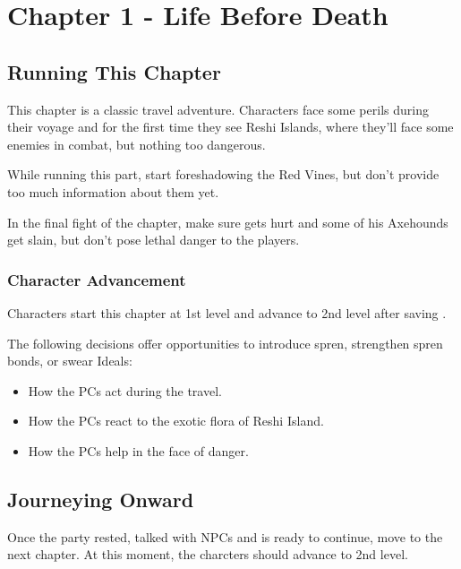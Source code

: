 \chapter{Chapter 1 - Life Before Death}
\label{chap:chapter1}

\setcounter{section}{-1}
\section{Running This Chapter}

This chapter is a classic travel adventure. Characters face some perils during their voyage and for the first time they see Reshi Islands, where they'll face some enemies in combat, but nothing too dangerous.

While running this part, start foreshadowing the Red Vines, but don't provide too much information about them yet.

In the final fight of the chapter, make sure \npcMedic{} gets hurt and some of his Axehounds get slain, but don't pose lethal danger to the players.

\subsection{Character Advancement}

Characters start this chapter at 1st level and advance to 2nd level after saving \npcMedic{}.

The following decisions offer opportunities to introduce spren, strengthen spren bonds, or swear Ideals:
\begin{itemize}
	\item How the PCs act during the travel.
	\item How the PCs react to the exotic flora of Reshi Island.
	\item How the PCs help \npcMedic{} in the face of danger.
\end{itemize}


\newpage




\section{Journeying Onward}

Once the party rested, talked with NPCs and is ready to continue, move to the next chapter. At this moment, the charcters should advance to 2nd level.